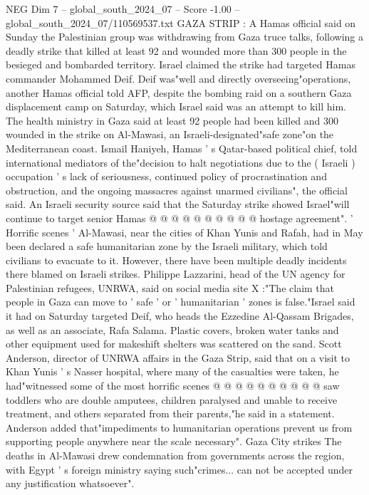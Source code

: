 \begin{textsample}{NEG Dim 7 – global\_south\_2024\_07 – Score -1.00 – global\_south\_2024\_07/110569537.txt}  \label{ex:f7_neg_355}
GAZA STRIP : A Hamas official said on Sunday the Palestinian group was withdrawing from Gaza truce talks, following a deadly strike that killed at least 92 and wounded more than 300 people in the besieged and bombarded territory.
Israel claimed the strike had targeted Hamas commander Mohammed Deif.
Deif was"well and directly overseeing"operations, another Hamas official told AFP, despite the bombing raid on a southern Gaza displacement camp on Saturday, which Israel said was an attempt to kill him.
The health ministry in Gaza said at least 92 people had been killed and 300 wounded in the strike on Al-Mawasi, an Israeli-designated"safe zone"on the Mediterranean coast.
Ismail Haniyeh, Hamas ' s Qatar-based political chief, told international mediators of the"decision to halt negotiations due to the ( Israeli ) occupation ' s lack of seriousness, continued policy of procrastination and obstruction, and the ongoing massacres against unarmed civilians", the official said.
An Israeli security source said that the Saturday strike showed Israel"will continue to target senior Hamas @ @ @ @ @ @ @ @ @ @ hostage agreement". ' Horrific scenes ' Al-Mawasi, near the cities of Khan Yunis and Rafah, had in May been declared a safe humanitarian zone by the Israeli military, which told civilians to evacuate to it.
However, there have been multiple deadly incidents there blamed on Israeli strikes.
Philippe Lazzarini, head of the UN agency for Palestinian refugees, UNRWA, said on social media site X :"The claim that people in Gaza can move to ' safe ' or ' humanitarian ' zones is false."Israel said it had on Saturday targeted Deif, who heads the Ezzedine Al-Qassam Brigades, as well as an associate, Rafa Salama.
Plastic covers, broken water tanks and other equipment used for makeshift shelters was scattered on the sand.
Scott Anderson, director of UNRWA affairs in the Gaza Strip, said that on a visit to Khan Yunis ' s Nasser hospital, where many of the casualties were taken, he had"witnessed some of the most horrific scenes @ @ @ @ @ @ @ @ @ @ saw toddlers who are double amputees, children paralysed and unable to receive treatment, and others separated from their parents,"he said in a statement.
Anderson added that"impediments to humanitarian operations prevent us from supporting people anywhere near the scale necessary".
Gaza City strikes The deaths in Al-Mawasi drew condemnation from governments across the region, with Egypt ' s foreign ministry saying such"crimes... can not be accepted under any justification whatsoever".

\end{textsample}
